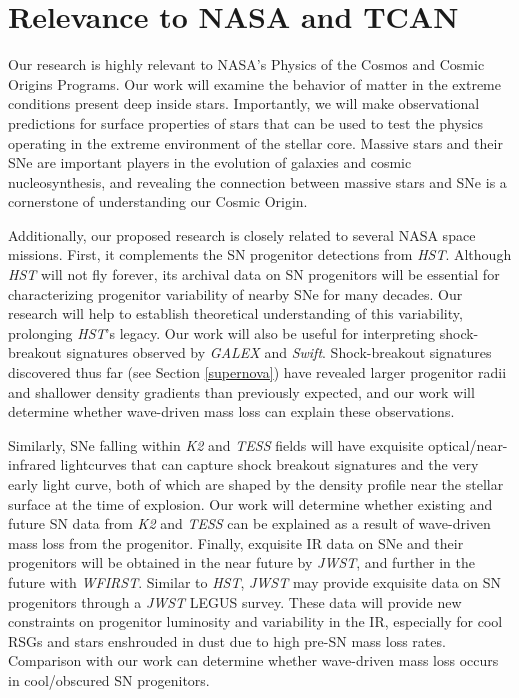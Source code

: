 {\color{orange}

\section{Relevance to NASA and TCAN}



Our research is highly relevant to NASA's Physics of the Cosmos and Cosmic Origins Programs. Our work will examine the behavior of matter in the extreme conditions present deep inside stars. Importantly, we will make observational predictions for  surface properties of stars that can be used to test the physics operating in the extreme environment of the stellar core. Massive stars and their SNe are important players in the evolution of galaxies and cosmic nucleosynthesis, and revealing the connection between massive stars and SNe is a cornerstone of understanding our Cosmic Origin.

Additionally, our proposed research is closely related to several NASA space missions. First, it complements the SN progenitor detections from {\it HST}. Although {\it HST} will not fly forever, its archival data on SN progenitors will be essential for characterizing progenitor variability of nearby SNe for many decades. Our research will help to establish theoretical understanding of this variability, prolonging {\it HST}'s legacy. Our work will also be useful for interpreting shock-breakout signatures observed by {\it GALEX} and {\it Swift}. Shock-breakout signatures discovered thus far (see Section \ref{supernova}) have revealed larger progenitor radii and shallower density gradients than previously expected, and our work will determine whether wave-driven mass loss can explain these observations.

Similarly, SNe falling within {\it K2} and {\it TESS} fields will have exquisite optical/near-infrared lightcurves that can capture shock breakout signatures and the very early light curve, both of which are shaped by the density profile near the stellar surface at the time of explosion. Our work will determine whether existing and future SN data from {\it K2} and {\it TESS} can be explained as a result of wave-driven mass loss from the progenitor. Finally, exquisite IR data on SNe and their progenitors will be obtained in the near future by {\it JWST}, and further in the future with {\it WFIRST}. Similar to {\it HST}, {\it JWST} may provide exquisite data on SN progenitors through a {\it JWST} LEGUS survey. These data will provide new constraints on progenitor luminosity and variability in the IR, especially for cool RSGs and stars enshrouded in dust due to high pre-SN mass loss rates. Comparison with our work can determine whether wave-driven mass loss occurs in cool/obscured SN progenitors.


}